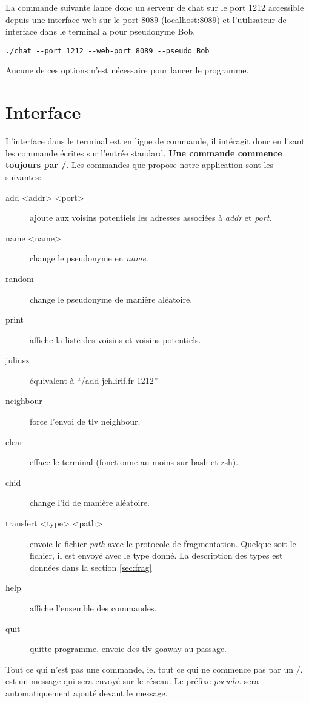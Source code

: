 \documentclass[a4paper,10pt]{article} %
\begin{document}
La commande suivante lance donc un serveur de chat sur le port 1212 accessible depuis une interface web sur le port 8089 (\href{localhost:8089}{localhost:8089}) et l'utilisateur de interface dans le terminal a pour pseudonyme Bob.

\begin{verbatim}
./chat --port 1212 --web-port 8089 --pseudo Bob
\end{verbatim}

Aucune de ces options n'est nécessaire pour lancer le programme.

\section{Interface}

L'interface dans le terminal est en ligne de commande, il intéragit donc en lisant les commande écrites sur l'entrée standard. \textbf{Une commande commence toujours par /}. Les commandes que propose notre application sont les suivantes:
\begin{description}
\item[add <addr> <port>] ajoute aux voisins potentiels les adresses associées à \textit{addr} et \textit{port}.
\item[name <name>] change le pseudonyme en \textit{name}.
\item[random] change le pseudonyme de manière aléatoire.
\item[print] affiche la liste des voisins et voisins potentiels.
\item[juliusz] équivalent à ``/add jch.irif.fr 1212''
\item[neighbour] force l'envoi de tlv neighbour.
\item[clear] efface le terminal (fonctionne au moins sur bash et zsh).
\item[chid] change l'id de manière aléatoire.
\item[transfert <type> <path>] envoie le fichier \textit{path} avec le protocole de fragmentation. Quelque soit le fichier, il est envoyé avec le type donné. La description des types est données dans la section \ref{sec:frag}
\item[help] affiche l'ensemble des commandes.
\item[quit] quitte programme, envoie des tlv goaway au passage.
\end{description}

Tout ce qui n'est pas une commande, ie. tout ce qui ne commence pas par un \textrm{/}, est un message qui sera envoyé sur le réseau. Le préfixe \textit{pseudo: } sera automatiquement ajouté devant le message.
\end{document}
